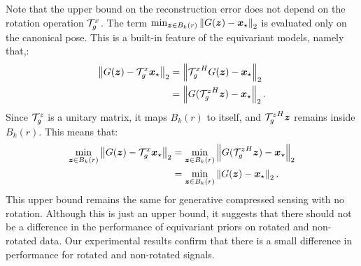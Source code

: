 Note that the upper bound on the reconstruction error does not depend on the rotation operation ${\mathcal{T}}_g^x$. The term $\min_{{\bm{z}}\in B_k(r)}\left\|G({\bm{z}})-{\bm{x}}_\star\right\|_2$ is evaluated only on the canonical pose. This is a built-in feature of the equivariant models, namely that,:
\begin{align*}
\left\|G({\bm{z}})-{\mathcal{T}}_g^x {\bm{x}}_\star\right\|_2 &= \left\|{{\mathcal{T}}_g^x}^{H}G({\bm{z}})- {\bm{x}}_\star\right\|_2\\
&= \left\|G({{\mathcal{T}}_g^z}^{H}{\bm{z}})- {\bm{x}}_\star\right\|_2.
\end{align*}
Since ${{\mathcal{T}}_g^z}$ is a unitary matrix, it maps $B_k(r)$ to itself, and ${{\mathcal{T}}_g^z}^{H}{\bm{z}}$ remains inside $B_k(r)$. This means that:
\begin{align*}
\min_{{\bm{z}}\in B_k(r)}\left\|G({\bm{z}})-{\mathcal{T}}_g^x {\bm{x}}_\star\right\|_2 
&=\min_{{\bm{z}}\in B_k(r)} \left\|G({{\mathcal{T}}_g^z}^{H}{\bm{z}})- {\bm{x}}_\star\right\|_2\\
&=\min_{{\bm{z}}\in B_k(r)} \left\|G({\bm{z}})- {\bm{x}}_\star\right\|_2.
\end{align*}
This upper bound remains the same for generative compressed sensing with no rotation. Although this is just an upper bound, it suggests that there should not be a difference in the performance of equivariant priors on rotated and non-rotated data. Our experimental results confirm that there is a small difference in performance for rotated and non-rotated signals. 